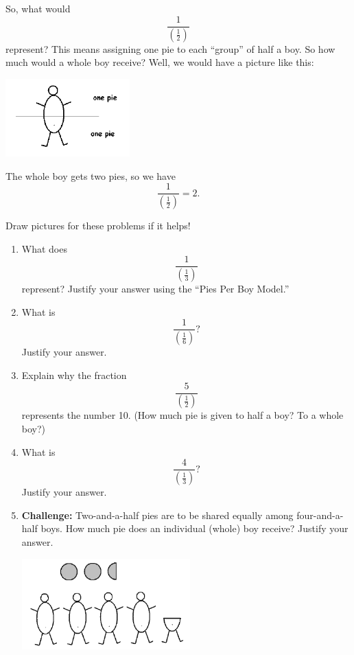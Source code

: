 So, what would 
\[
\frac 1 {\left( \frac 1 2\right) }
\]
 represent?
 This means assigning one pie to each ``group'' of half a boy. So how much would a
whole boy receive?  Well, we would have a picture like this:
   \begin{center}
\includegraphics[height = 3cm]{halfboy}
\end{center}
The whole boy gets two pies,
so we have
\[
\frac 1 {\left( \frac 1 2\right) }
= 2.
\]



\begin{thinkpair*}
Draw pictures for these problems if it helps!

\begin{enumerate}
\item
What does 
\[
\frac 1 {\left( \frac 1 3\right) }
\]
represent?  Justify your answer using the ``Pies Per Boy Model.''\\

\item
What is  
\[
\frac 1 {\left( \frac 1 6\right) }?
\]
Justify your answer.\\


\item
Explain why  the fraction
\[
\frac 5 {\left( \frac 1 2\right) }
\]
represents the number 10.  (How much pie is given to half a boy?  To a whole boy?)\\


\item
What is  
\[
\frac 4 {\left( \frac 1 3\right) }?
\]
Justify your answer.\\

\item{\bf Challenge:}
Two-and-a-half pies are to be shared equally among four-and-a-half boys.  How much pie does an individual (whole) boy receive?  Justify your answer.
  \begin{center}
\includegraphics[height = 3.5cm]{5ninthspie}
\end{center}




\end{enumerate}

\end{thinkpair*}





